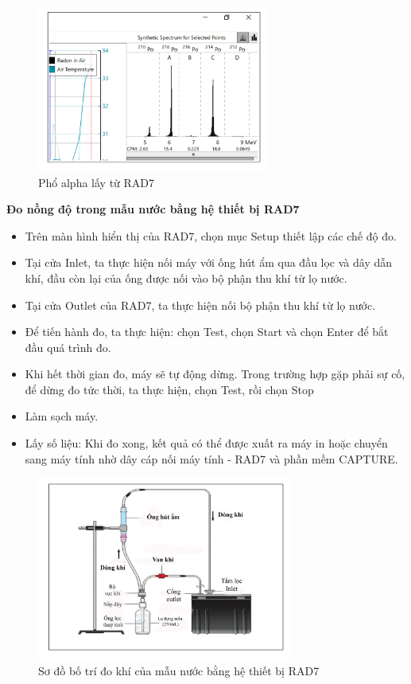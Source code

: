     \begin{figure}[htbp]
        \centering
        \includegraphics[width=0.68\textwidth]{Image/MnO2-Figure2.png}
        \caption{Phổ alpha lấy từ RAD7}
        \label{figure:PhoAlphaRAD7}
    \end{figure}
    

    \textbf{Đo nồng độ  trong mẫu nước bằng hệ thiết bị RAD7}

\begin{itemize}
    \item Trên màn hình hiển thị của RAD7, chọn mục Setup thiết lập các chế độ đo.
    \item Tại cửa Inlet, ta thực hiện nối máy với ống hút ẩm qua đầu lọc và dây dẫn khí,  đầu còn lại của ống được nối vào bộ phận thu khí từ lọ nước.
    \item Tại cửa Outlet của RAD7, ta thực hiện nối bộ phận thu khí từ lọ nước.
    \item Để tiến hành đo, ta thực hiện: chọn Test, chọn Start và chọn Enter để bắt đầu quá trình đo.
    \item Khi hết thời gian đo, máy sẽ tự động dừng. Trong trường hợp gặp phải sự cố, để dừng đo tức thời, ta thực hiện, chọn Test, rồi chọn Stop 
    \item Làm sạch máy.
    \item Lấy số liệu: Khi đo xong, kết quả có thể được xuất ra máy in hoặc chuyển sang máy tính
    nhờ dây cáp nối máy tính - RAD7 và phần mềm CAPTURE.
\end{itemize}

 
    \begin{figure}[htbp]
        \centering 
        \includegraphics[width=0.75\textwidth]{Image/MnO2-Figure1.png}
        \caption{Sơ đồ bố trí đo khí  của mẫu nước bằng hệ thiết bị RAD7}
        \label{figure:RADSoDoDoMauNuoc}
    \end{figure}



